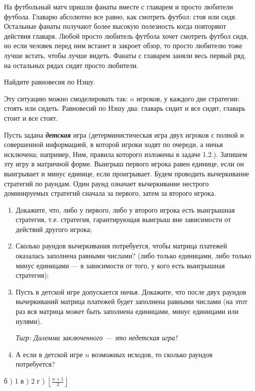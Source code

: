 \begin{problem}
На футбольный матч пришли фанаты вместе с главарем и просто любители футбола. Главарю абсолютно все равно, как смотреть футбол: стоя или сидя. Остальные фанаты получают более высокую полезность когда повторяют действия главаря. Любой просто любитель футбола хочет смотреть футбол сидя, но если человек перед ним встанет и закроет обзор, то просто любителю тоже лучше встать, чтобы лучше видеть. Фанаты с главарем заняли весь первый ряд, на остальных рядах сидят просто любители.\par
Найдите равновесия по Нэшу.

\begin{sol}
Эту ситуацию можно смоделировать так: $n$ игроков, у каждого две стратегии: стоять или сидеть. Равновесий по Нэшу два: главарь сидит и все сидят, главарь стоит и все стоят.
\end{sol}
\end{problem}



\begin{problem}[Детские игры \cite{ewerhart:clg}] %
Пусть задана {\bf {\it детская}} игра (детерминистическая игра двух игроков с полной и совершенной информацией, в которой игроки ходят по очереди, а ничья исключена; например, Ним, правила которого изложены в задаче 1.2.). Запишем эту игру в матричной форме. Выигрыш первого игрока равен единице, если он выигрывает и минус единице, если проигрывает. Будем проводить вычеркивание стратегий по раундам. Один раунд означает вычеркивание нестрого доминируемых стратегий сначала за первого, затем за второго игрока.\par
\begin{enumerate}
\item 	Докажите, что, либо у первого, либо у второго игрока есть выигрышная стратегия, т.е. стратегия, гарантирующая выигрыш вне зависимости от действий другого игрока;\par
\item 	Сколько раундов вычеркивания потребуется, чтобы матрица платежей оказалась заполнена равными числами? (либо только единицами, либо только минус единицами --- в зависимости от того, у кого есть выигрышная стратегия);\par
\item 	Пусть в детской игре допускается ничья. Докажите, что после двух раундов вычеркиваний матрица платежей будет заполнена равными числами (на этот раз вся матрица может быть заполнена единицами, минус единицами или нулями).\par
{\it Тигр: Дилемма заключенного --- это недетская игра!}\par

\item А если в детской игре $n$ возможных исходов, то сколько раундов потребуется?
\end{enumerate}


\begin{sol}
б ) 1
в ) 2
г ) $\left\lfloor  \frac{n+1}{2} \right\rfloor$
\end{sol}
\end{problem}


